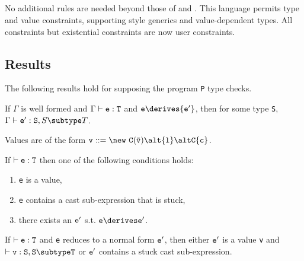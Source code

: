 \subsection{\FXGD} 

No additional rules are needed beyond those of \FXG{} and \FXD{}. This
language permits type and value constraints, supporting \FGJ{} style
generics and value-dependent types. All constraints but existential constraints are now user constraints.

\subsection{Results}
The following results hold for \FXGD supposing the program {\tt P} type checks.

\begin{theorem} If $\Gamma$ is well formed and $\Gamma \vdash {\tt e:T}$ and ${\tt e} \derives {\tt e'}$, then
for some type {\tt S}, $\Gamma \vdash {\tt e':S},{S \subtype T}$.
\end{theorem}

Values are of the form $\tt v ::= \new\ C(\bar{\tt v}) \alt {\tt l} \alt C\{c\}$.

\begin{theorem}[Progress]
If $\vdash {\tt e:T}$ then one of the following conditions holds:
\begin{enumerate}
\item {\tt e} is a value,
\item {\tt e} contains a cast sub-expression that is stuck,
\item there exists an $\tt e'$ s.t. $\tt e\derives e'$.
\end{enumerate}
\end{theorem}

\begin{theorem}
If $\vdash {\tt e:T}$ and {\tt e}
reduces to a normal form ${\tt e'}$, then
either $\tt e'$ is a value {\tt v} and $\vdash {\tt v:S},{\tt S\subtype T}$ or
${\tt e'}$ contains  a stuck cast sub-expression.
\end{theorem}

